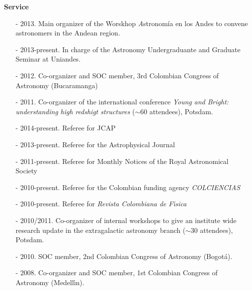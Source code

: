 \documentclass[9pt]{article}
\begin{document}
{\bf Service}
\begin{itemize}
\item[-] 2013. Main organizer of the Worskhop {\textit Astronom\'ia en
  los Andes} to convene astronomers in the Andean region.  
\item[-] 2013-present. In charge of the Astronomy Undergraduante and Graduate Seminar at Uniandes. 
\item[-] 2012. Co-organizer and SOC member, 3rd Colombian Congress of
  Astronomy (Bucaramanga) 
\item[-] 2011. Co-organizer of the international conference {\it Young
  and Bright: understanding high redshigt structures} ($\sim 60$
  attendees), Potsdam. 
\item[-] 2014-present. Referee for JCAP  %
\item[-] 2013-present. Referee for the Astrophysical Journal %
\item[-] 2011-present. Referee for Monthly Notices of the Royal
  Astronomical Society %
\item[-] 2010-present. Referee for the Colombian funding agency {\it
  COLCIENCIAS} %
\item[-] 2010-present. Referee for {\it Revista Colombiana de
  F\'{\i}sica} %
\item[-] 2010/2011. Co-organizer of internal workshops to give an
  institute wide research update in the extragalactic astronomy branch
  ($\sim 30$ attendees), Potsdam. 
\item[-] 2010. SOC member, 2nd Colombian Congress of Astronomy (Bogot\'a).
\item[-] 2008. Co-organizer and SOC member, 1st Colombian Congress of
  Astronomy (Medell\'{\i}n). 
\end{itemize}
\end{document}

